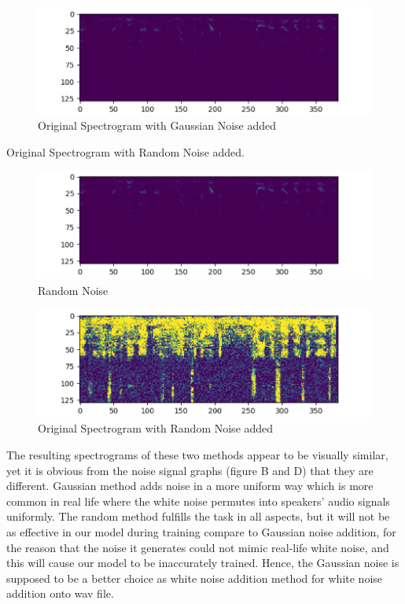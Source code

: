 \documentclass[runningheads,a4paper]{llncs}
\begin{document}
\begin{figure}[H]
\includegraphics[scale=0.25]{figureC.png}
\caption{Original Spectrogram with Gaussian Noise added}
\label{fig:framework}
\end{figure}

Original Spectrogram with Random Noise added.\\

\begin{figure}[H]
\includegraphics[scale=0.25]{figureD.png}
\caption{Random Noise}
\label{fig:framework}
\end{figure}

\begin{figure}[H]
\includegraphics[scale=0.25]{figureE.png}
\caption{Original Spectrogram with Random Noise added}
\label{fig:framework}
\end{figure}

The resulting spectrograms of these two methods appear to be visually similar, yet it is obvious from the noise signal graphs (figure B and D) that they are different. Gaussian method adds noise in a more uniform way which is more common in real life where the white noise permutes into speakers’ audio signals uniformly. The random method fulfills the task in all aspects, but it will not be as effective in our model during training compare to Gaussian noise addition, for the reason that the noise it generates could not mimic real-life white noise, and this will cause our model to be inaccurately trained. Hence, the Gaussian noise is supposed to be a better choice as white noise addition method for white noise addition onto wav file.\\
\end{document}
